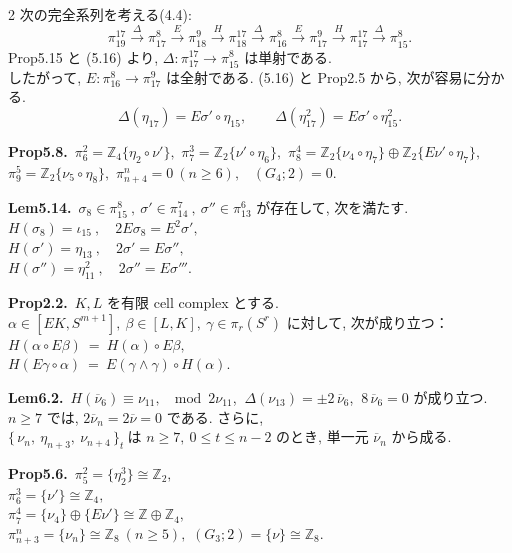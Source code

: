 \documentclass[10pt, leqno]{ltjsarticle}
\newcommand{\todai}[2][]{\{\,#2\,\}_{#1}}      %
\newcommand{\gen}[1]{\{#1\}}       %
\newcommand{\pit}[2]{\pi_{#1}^{#2}}
\numberwithin{equation}{section}
\theoremstyle{plain}
\theoremstyle{definition}
\theoremstyle{remark}
\begin{document}
\begin{paracol}{2}
\medskip
\noindent
次の完全系列を考える(4.4):
\[
\pit{19}{17}\xrightarrow{\ \Delta\ }\pit{17}{8}\xrightarrow{\ E\ }\pit{18}{9}
\xrightarrow{\ H\ }\pit{18}{17}\xrightarrow{\ \Delta\ }\pit{16}{8}
\xrightarrow{E}\pit{17}{9}\xrightarrow{H}\pit{17}{17}
\xrightarrow{\Delta}\pit{15}{8}.
\]
Prop5.15 と (5.16) より,
\(\Delta:\pit{17}{17}\to\pit{15}{8}\) は単射である. \\
したがって, \(E:\pit{16}{8}\to\pit{17}{9}\) は全射である. 
(5.16) と Prop2.5 から,
次が容易に分かる. 
\[
\Delta(\eta_{17})=E\sigma'\circ\eta_{15},\qquad
\Delta(\eta_{17}^{2})=E\sigma'\circ\eta_{15}^{2}.
\]

\switchcolumn

\noindent
\textbf{Prop5.8.}\
\(\pi^{2}_{6}=\mathbb Z_4\gen{\eta_{2}\circ\nu'},\) \quad
\(\pi^{3}_{7}=\mathbb Z_2\gen{\nu'\circ\eta_6},\) \quad
\(\pi^{4}_{8}=\mathbb Z_2\gen{\nu_{4}\circ\eta_7}\oplus \mathbb Z_2\gen{E\nu'\circ\eta_7},\) \\
\(\pi^{5}_{9}=\mathbb Z_2\gen{\nu_{5}\circ\eta_8},\) \quad
\(\pi^{n}_{n+4}=0\ (n\ge6),\) \
\((G_{4};2)=0.\)

\noindent
\textbf{Lem5.14.}\
\(\sigma_{8}\in\pi^{8}_{15}\ , \ \sigma'\in\pi^{7}_{14}\ , \ \sigma''\in\pi^{6}_{13}\) 
が存在して, 次を満たす. \\
\(H(\sigma_{8})=\iota_{15} \ ,\quad 2E\sigma_{8}=E^{2}\sigma',\)\\
\(H(\sigma')=\eta_{13} \ ,\quad 2\sigma'=E\sigma'',\)\\
\(H(\sigma'')=\eta_{11}^2 \ ,\quad 2\sigma''=E\sigma''' .\)

\noindent
\textbf{Prop2.2.}\
$K,L$ を有限 cell complex とする. \\
$\alpha\in[EK, S^{m+1}], \ \beta\in[L,K], \ \gamma\in\pi_r(S^r)$ 
に対して, 次が成り立つ：\\
\(
H(\alpha\circ E\beta)\ =\ H(\alpha)\circ E\beta,
\)\\
\(
H(E\gamma\circ\alpha)\ =\ E(\gamma\wedge\gamma)\circ H(\alpha).
\)

\noindent
\textbf{Lem6.2.}\
\(H(\overline{\nu}_6)\equiv\nu_{11},\ \mod 2\nu_{11}\text{}\), 
\(\ \Delta(\nu_{13})=\pm 2\,\overline{\nu}_6\), 
\(\ 8\,\overline{\nu}_6=0\) が成り立つ. \\
\(n\ge7\) では,
\(2\overline{\nu}_n=2\overline{\nu}=0\) である. さらに,\\
\(
\todai[t]{\nu_n,\ \eta_{n+3},\ \nu_{n+4}}\ \text{は }n\ge7,\ 
0\le t\le n-2\text{ のとき, 単一元 }\overline{\nu}_n\text{ から成る. }
\)

\noindent
\textbf{Prop5.6.}\
\(\pi^{2}_{5}=\gen{\eta_{2}^{3}}\cong \mathbb Z_{2},\) \\
\(\pi^{3}_{6}=\gen{\nu'}\cong \mathbb Z_{4},\) \\
\(\pi^{4}_{7}=\gen{\nu_{4}}\oplus \gen{E\nu'}\cong \mathbb Z\oplus\mathbb Z_{4},\) \\
\(\pi^{n}_{n+3}=\gen{\nu_{n}}\cong \mathbb Z_{8}\ (n\ge5),\)\qquad
\((G_{3};2)=\gen{\nu}\cong \mathbb Z_{8}.\)


\end{paracol}
\end{document}
